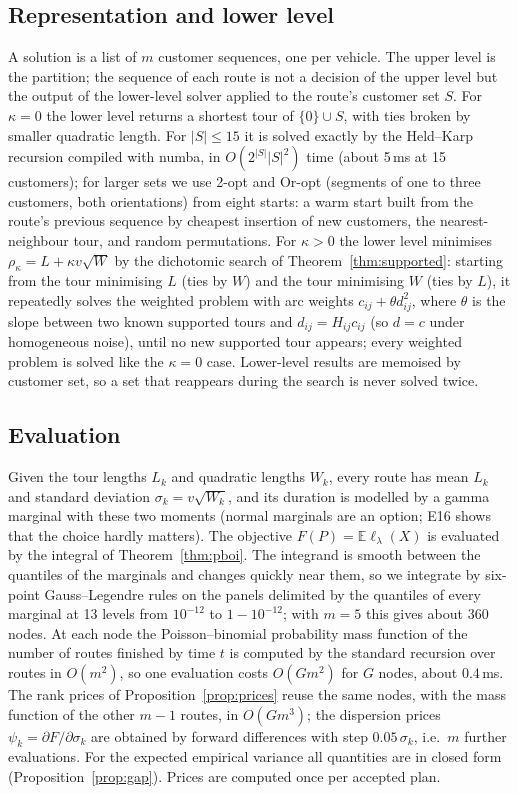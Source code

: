 \documentclass[11pt]{article}
\theoremstyle{definition}
\newcommand{\E}{\mathbb{E}}
\newcommand{\lord}{\ell_\lambda}
\begin{document}
\subsection{Representation and lower level}\label{sec:alg:lower}
A solution is a list of $m$ customer sequences, one per vehicle. The upper
level is the partition; the sequence of each route is not a decision of the
upper level but the output of the lower-level solver applied to the route's
customer set $S$. For $\kappa=0$ the lower level returns a shortest tour of
$\{0\}\cup S$, with ties broken by smaller quadratic length. For $|S|\le15$ it
is solved exactly by the Held--Karp recursion \citep{heldkarp1962dynamic}
compiled with numba, in $O(2^{|S|}|S|^2)$ time (about 5\,ms at 15
customers); for larger sets we use 2-opt and Or-opt (segments of one to three
customers, both orientations) from eight starts: a warm start built from the
route's previous sequence by cheapest insertion of new customers, the
nearest-neighbour tour, and random permutations. For $\kappa>0$ the lower
level minimises $\rho_\kappa=L+\kappa v\sqrt W$ by the dichotomic search of
Theorem~\ref{thm:supported}: starting from the tour minimising $L$ (ties by
$W$) and the tour minimising $W$ (ties by $L$), it repeatedly solves the
weighted problem with arc weights $c_{ij}+\theta d_{ij}^2$, where $\theta$ is
the slope between two known supported tours and $d_{ij}=H_{ij}c_{ij}$ (so
$d=c$ under homogeneous noise), until no new supported tour appears; every
weighted problem is solved like the $\kappa=0$ case. Lower-level results are
memoised by customer set, so a set that reappears during the search is never
solved twice.

\subsection{Evaluation}\label{sec:alg:eval}
Given the tour lengths $L_k$ and quadratic lengths $W_k$, every route has
mean $L_k$ and standard deviation $\sigma_k=v\sqrt{W_k}$, and its duration is
modelled by a gamma marginal with these two moments (normal marginals are an
option; E16 shows that the choice hardly matters). The objective
$F(P)=\E\lord(X)$ is evaluated by the integral of Theorem~\ref{thm:pboi}. The
integrand is smooth between the quantiles of the marginals and changes
quickly near them, so we integrate by six-point Gauss--Legendre rules on the
panels delimited by the quantiles of every marginal at 13 levels from
$10^{-12}$ to $1-10^{-12}$; with $m=5$ this gives about 360 nodes. At each node
the Poisson--binomial probability mass function of the number of routes
finished by time $t$ is computed by the standard recursion over routes in
$O(m^2)$, so one evaluation costs $O(Gm^2)$ for $G$ nodes, about $0.4$\,ms.
The rank prices of Proposition~\ref{prop:prices} reuse the same nodes, with
the mass function of the other $m-1$ routes, in $O(Gm^3)$; the dispersion
prices $\psi_k=\partial F/\partial\sigma_k$ are obtained by forward
differences with step $0.05\,\sigma_k$, i.e.\ $m$ further evaluations. For the
expected empirical variance all quantities are in closed form
(Proposition~\ref{prop:gap}). Prices are computed once per accepted plan.
\end{document}
